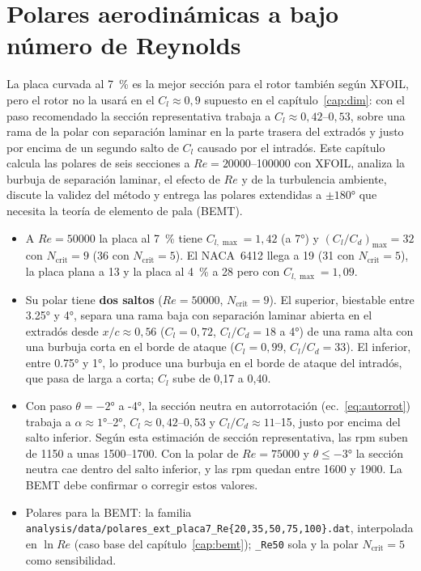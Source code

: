 \chapter{Polares aerodinámicas a bajo número de Reynolds}\label{cap:polares}

La placa curvada al \SI{7}{\percent} es la mejor sección para el rotor también según
XFOIL, pero el rotor no la usará en el $C_l\approx0{,}9$ supuesto en el
capítulo~\ref{cap:dim}: con el paso recomendado la sección representativa trabaja a
$C_l\approx0{,}42$--$0{,}53$, sobre una rama de la polar con separación laminar en la
parte trasera del extradós y justo por encima de un segundo salto de $C_l$ causado por
el intradós. Este capítulo calcula las polares de seis secciones a
$Re=\num{20000}$--\num{100000} con XFOIL, analiza la burbuja de separación laminar, el
efecto de $Re$ y de la turbulencia ambiente, discute la validez del método y entrega las
polares extendidas a $\pm\ang{180}$ que necesita la teoría de elemento de pala (BEMT).

\begin{resultado}
\begin{itemize}
  \item A $Re=\num{50000}$ la placa al \SI{7}{\percent} tiene $C_{l,\max}=1{,}42$ (a
        \ang{7}) y $(C_l/C_d)_{\max}=32$ con $N_{\text{crit}}=9$ (36 con
        $N_{\text{crit}}=5$). El NACA~6412 llega a 19 (31 con $N_{\text{crit}}=5$), la
        placa plana a 13 y la placa al \SI{4}{\percent} a 28 pero con $C_{l,\max}=1{,}09$.
  \item Su polar tiene \textbf{dos saltos} ($Re=\num{50000}$, $N_{\text{crit}}=9$). El
        superior, biestable entre \ang{3.25} y \ang{4}, separa una rama baja con
        separación laminar abierta en el extradós desde $x/c\approx0{,}56$ ($C_l=0{,}72$,
        $C_l/C_d=18$ a \ang{4}) de una rama alta con una burbuja corta en el borde de
        ataque ($C_l=0{,}99$, $C_l/C_d=33$). El inferior, entre \ang{0.75} y \ang{1}, lo
        produce una burbuja en el borde de ataque del intradós, que pasa de larga a corta;
        $C_l$ sube de 0,17 a 0,40.
  \item Con paso $\theta=\ang{-2}$ a \ang{-4}, la sección neutra en autorrotación
        (ec.~\ref{eq:autorrot}) trabaja a $\alpha\approx\ang{1}$--\ang{2},
        $C_l\approx0{,}42$--$0{,}53$ y $C_l/C_d\approx11$--15, justo por encima del salto
        inferior. Según esta estimación de sección representativa, las rpm suben de
        \num{1150} a unas \num{1500}--\num{1700}. Con la polar de $Re=\num{75000}$ y
        $\theta\le\ang{-3}$ la sección neutra cae dentro del salto inferior, y las rpm
        quedan entre \num{1600} y \num{1900}. La BEMT debe confirmar o corregir estos
        valores.
  \item Polares para la BEMT: la familia
        \texttt{analysis/data/polares\_ext\_\allowbreak placa7\_Re\{20,35,50,75,100\}.dat}, interpolada en
        $\ln Re$ (caso base del capítulo~\ref{cap:bemt}); \texttt{\_Re50} sola y la polar
        $N_{\text{crit}}=5$ como sensibilidad.
\end{itemize}
\end{resultado}

